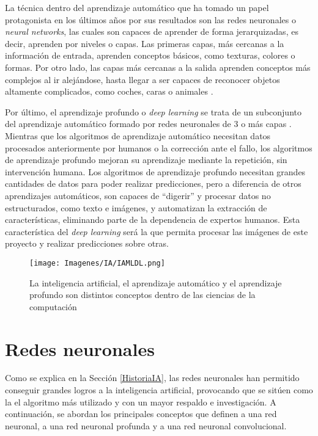 \documentclass{report}
\begin{document}
La técnica dentro del aprendizaje automático que ha tomado un papel protagonista en los últimos años por sus resultados son las redes neuronales o \textit{neural networks}, las cuales son capaces de aprender de forma jerarquizadas, es decir, aprenden por niveles o capas. Las primeras capas, más cercanas a la información de entrada, aprenden conceptos básicos, como texturas, colores o formas. Por otro lado, las capas más cercanas a la salida aprenden conceptos más complejos al ir alejándose, hasta llegar a ser capaces de reconocer objetos altamente complicados, como coches, caras o animales \cite{VideoCSV}.


Por último, el aprendizaje profundo o \textit{deep learning} se trata de un subconjunto del aprendizaje automático formado por redes neuronales de 3 o más capas \cite{IBMEspañol}. Mientras que los algoritmos de aprendizaje automático necesitan datos procesados anteriormente por humanos o la corrección ante el fallo, los algoritmos de aprendizaje profundo mejoran su aprendizaje mediante la repetición, sin intervención humana. Los algoritmos de aprendizaje profundo necesitan grandes cantidades de datos para poder realizar predicciones, pero a diferencia de otros aprendizajes automáticos, son capaces de ``digerir'' y procesar datos no estructurados, como texto e imágenes, y automatizan la extracción de características, eliminando parte de la dependencia de expertos humanos. Esta característica del \textit{deep learning} será la que permita procesar las imágenes de este proyecto y realizar predicciones sobre otras.


\vspace{0.4cm}
\begin{figure}[H]
    \centering
    \texttt{[image: Imagenes/IA/IAMLDL.png]}
    \caption{ La inteligencia artificial, el aprendizaje automático y el aprendizaje profundo son distintos conceptos dentro de las ciencias de la computación }
    \label{fig:IAMLDL}
\end{figure}
\vspace{0.4cm}




\section{ Redes neuronales }


Como se explica en la Sección \ref{HistoriaIA}, las redes neuronales han permitido conseguir grandes logros a la inteligencia artificial, provocando que se sitúen como la el algoritmo más utilizado y con un mayor respaldo e investigación. A continuación, se abordan los principales conceptos que definen a una red neuronal, a una red neuronal profunda y a una red neuronal convolucional.
\end{document}
